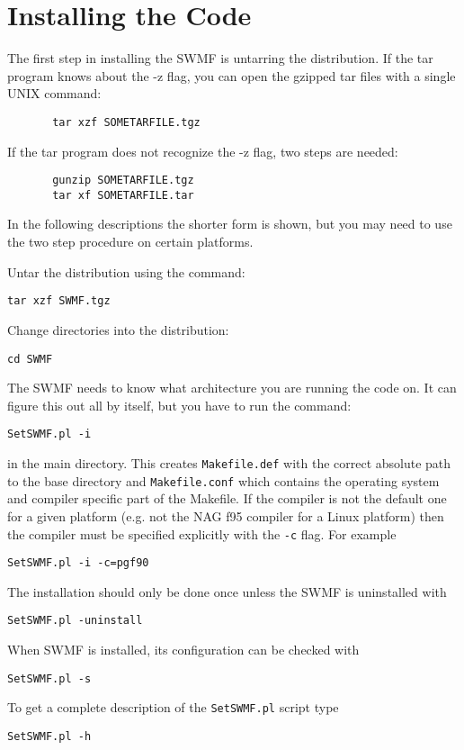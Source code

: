 \section{Installing the Code}

The first step in installing the SWMF is untarring the distribution.
If the tar program knows about the -z flag, you can open the gzipped
tar files with a single UNIX command:
\begin{verbatim}
       tar xzf SOMETARFILE.tgz
\end{verbatim}
If the tar program does not recognize the -z flag, two steps are needed:
\begin{verbatim}
       gunzip SOMETARFILE.tgz
       tar xf SOMETARFILE.tar
\end{verbatim}
In the following descriptions the shorter form is shown, but you may
need to use the two step procedure on certain platforms.

Untar the distribution using the command:
\begin{verbatim}
tar xzf SWMF.tgz
\end{verbatim}

Change directories into the distribution:
\begin{verbatim}
cd SWMF
\end{verbatim}

The SWMF needs to know what architecture you are running the code on.
It can figure this out all by itself, but you have to run the command:
\begin{verbatim}
SetSWMF.pl -i
\end{verbatim}
in the main directory. This creates {\tt Makefile.def} with
the correct absolute path to the base directory and {\tt Makefile.conf}
which contains the operating system and compiler specific part of
the Makefile. If the compiler is not the default one for a given
platform (e.g. not the NAG f95 compiler for a Linux platform) then
the compiler must be specified explicitly with the {\tt -c}
flag. For example
\begin{verbatim}
SetSWMF.pl -i -c=pgf90
\end{verbatim}
The installation should only be done once unless the SWMF is uninstalled with
\begin{verbatim}
SetSWMF.pl -uninstall
\end{verbatim}
When SWMF is installed, its configuration can be checked with
\begin{verbatim}
SetSWMF.pl -s
\end{verbatim}
To get a complete description of the {\tt SetSWMF.pl}  script type
\begin{verbatim}
SetSWMF.pl -h
\end{verbatim}

